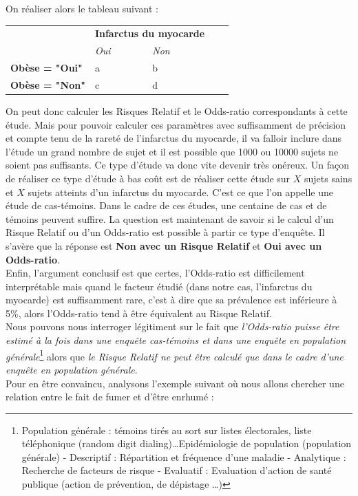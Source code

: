On réaliser alors le tableau suivant : 
\begin{center}
\begin{tabular}{l|l|l|ll}
\cline{2-3}
 & \multicolumn{2}{l|}{\textbf{Infarctus du myocarde}} &  &  \\ \cline{2-3}
 & \textit{Oui} & \textit{Non} &  &  \\ \cline{1-3}
\multicolumn{1}{|l|}{\textbf{Obèse = "Oui"}} & a & b &  &  \\ \cline{1-3}
\multicolumn{1}{|l|}{\textbf{Obèse = "Non"}} & c & d &  &  \\  \cline{1-3} 
\end{tabular}
\end{center}
On peut donc calculer les Risques Relatif et le Odds-ratio correspondants à cette étude.\newline
Mais pour pouvoir calculer ces paramètres avec suffisamment de précision et compte tenu de la rareté de l'infarctus du myocarde, il va falloir inclure dans l'étude un grand nombre de sujet et il est possible que 1000 ou 10000 sujets ne soient pas suffisants.\newline
Ce type d'étude va donc vite devenir très onéreux. \newline
Un façon de réaliser ce type d'étude à bas coût est de réaliser cette étude sur $X$ sujets sains et $X$ sujets atteints d'un infarctus du myocarde. C'est ce que l'on appelle une étude de cas-témoins. Dans le cadre de ces études, une centaine de cas et de témoins peuvent suffire.\newline
La question est maintenant de savoir si le calcul d'un Risque Relatif ou d'un Odds-ratio est possible à partir ce type d'enquête.\newline
Il s'avère que la réponse est \textbf{Non avec un Risque Relatif } et \textbf{Oui avec un Odds-ratio}.\newline
\\
Enfin, l'argument conclusif est que certes, l'Odds-ratio est difficilement interprétable mais quand le facteur étudié (dans notre cas, l'infarctus du myocarde) est suffisamment rare, c'est à dire que sa prévalence est inférieure à 5\%, alors l'Odds-ratio tend à être équivalent au Risque Relatif.\newline
\\ 
Nous pouvons nous interroger légitiment sur le fait que \textit{l'Odds-ratio puisse être estimé à la fois dans une enquête cas-témoins et dans une enquête en population générale}\footnote{Population générale : témoins tirés au sort sur listes électorales, liste téléphonique (random digit dialing)\dots Epidémiologie de population (population générale) - Descriptif : Répartition et fréquence d'une maladie - Analytique : Recherche de facteurs de risque - Evaluatif : Evaluation d'action de santé publique (action de prévention, de dépistage \dots)} alors que \textit{le Risque Relatif ne peut être calculé que dans le cadre d'une enquête en population générale}.\newline
\\
Pour en être convaincu, analysons l'exemple suivant où nous allons chercher une relation entre le fait de fumer et d'être enrhumé  :

